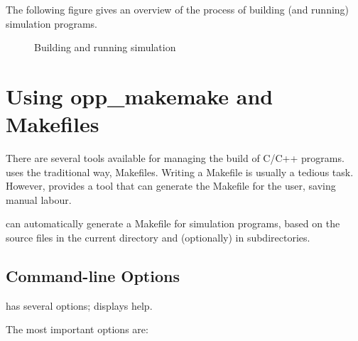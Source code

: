 The following figure gives an overview of the process of building
(and running) simulation programs.


\begin{figure}[htbp]
  \begin{center}
    
    \caption{Building and running simulation}
  \end{center}
\end{figure}

\section{Using opp\_makemake and Makefiles}
\label{sec:build-sim-progs:opp-makemake}

There are several tools available for managing the build of C/C++ programs.
{\opp} uses the traditional way, Makefiles. Writing a Makefile is usually a
tedious task. However, {\opp} provides a tool that can generate the
Makefile for the user, saving manual labour.

 can automatically generate a Makefile for simulation
programs, based on the source files in the current directory and (optionally)
in subdirectories.

\subsection{Command-line Options}
\label{sec:build-sim-progs:makemake-options}

 has several options;
 displays help.

The most important options are:

